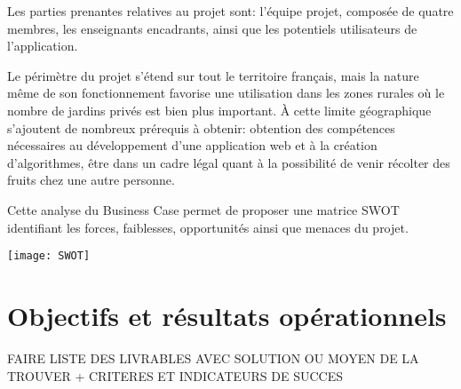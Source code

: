 \documentclass{article}
\begin{document}
\vspace{4mm}

Les parties prenantes relatives au projet sont: l'équipe projet, composée de quatre membres, les enseignants encadrants, ainsi que les potentiels utilisateurs de l'application.

Le périmètre du projet s'étend sur tout le territoire français, mais la nature même de son fonctionnement favorise une utilisation dans les zones rurales où le nombre de jardins privés est bien plus important.
À cette limite géographique s'ajoutent de nombreux prérequis à obtenir: obtention des compétences nécessaires au développement d'une application web et à la création d'algorithmes, être dans un cadre légal quant à la possibilité de venir récolter des fruits chez une autre personne.

\vspace{4mm}
 
Cette analyse du Business Case permet de proposer une matrice SWOT identifiant les forces, faiblesses, opportunités ainsi que menaces du projet.

\vspace{2mm}             
  
\begin{centering}
\texttt{[image: SWOT]}
\end{centering}

\maketitle
\section{Objectifs et résultats opérationnels}


FAIRE LISTE DES LIVRABLES AVEC SOLUTION OU MOYEN DE LA TROUVER +
CRITERES ET INDICATEURS DE SUCCES
\end{document}
